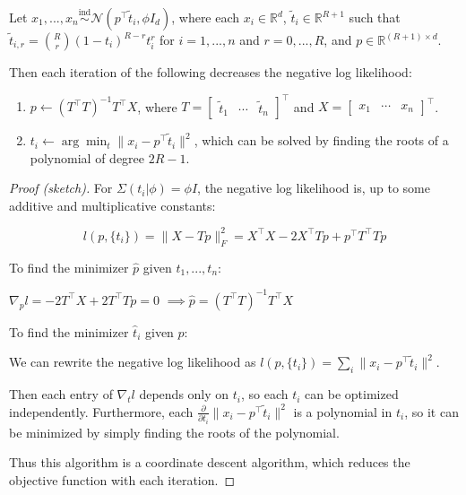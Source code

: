 \documentclass[
  11pt,
]{article}
\begin{document}
\begin{theorem}
Let $x_1, ..., x_n \stackrel{\mathrm{ind}}{\sim}\mathcal{N}(p^\top \tilde{t}_i, \phi I_d)$,
where each $x_i \in \mathbb{R}^d$, $\tilde{t}_i \in \mathbb{R}^{R+1}$ such that $\tilde{t}_{i,r} = \binom{R}{r} (1 - t_i)^{R-r} t_i^r$ for $i = 1, ..., n$ and $r = 0, ..., R$, 
and $p \in \mathbb{R}^{(R+1) \times d}$.

Then each iteration of the following decreases the negative log likelihood:

\begin{enumerate}
  \item $p \leftarrow (T^\top T)^{-1} T^\top X$, 
  where $T = \begin{bmatrix} \tilde{t}_1 & \cdots & \tilde{t}_n \end{bmatrix}^\top$ 
  and $X = \begin{bmatrix} x_1 & \cdots & x_n \end{bmatrix}^\top$.
  \item $t_i \leftarrow \arg\min_t \|x_i - p^\top \tilde{t}_i\|^2$,
  which can be solved by finding the roots of a polynomial of degree $2 R - 1$.
\end{enumerate}
\end{theorem}

\begin{proof}[Proof (sketch)]

For $\Sigma(t_i | \phi) = \phi I$, the negative log likelihood is, 
up to some additive and multiplicative constants:

$$l(p, \{t_i\}) = \|X - T p\|^2_F = X^\top X - 2 X^\top T p + p^\top T^\top T p$$

To find the minimizer $\hat{p}$ given $t_1, ..., t_n$:

$\nabla_p l = -2 T^\top X + 2 T^\top T p = 0$  
$\implies \hat{p} = (T^\top T)^{-1} T^\top X$

To find the minimizer $\hat{t}_i$ given $p$:

We can rewrite the negative log likelihood as 
$l(p, \{t_i\}) = \sum_i \|x_i - p^\top \tilde{t}_i\|^2$. 

Then each entry of $\nabla_{t} l$ depends only on $t_i$, so each $t_i$ can be optimized independently. 
Furthermore, each $\frac{\partial}{\partial t_i} \|x_i - p^\top \tilde{t}_i\|^2$ is a polynomial in $t_i$, so it can be minimized by simply finding the roots of the polynomial. 

Thus this algorithm is a coordinate descent algorithm, which reduces the objective function with each iteration. 
\end{proof}
\end{document}
